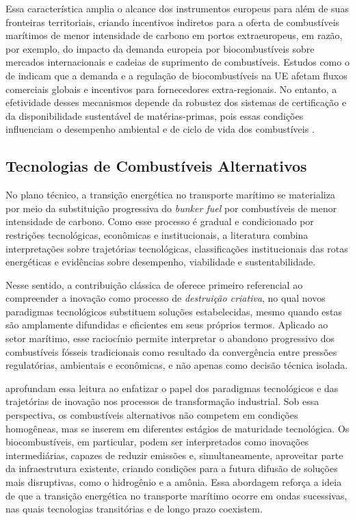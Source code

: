 Essa característica amplia o alcance dos instrumentos europeus para além de suas fronteiras territoriais, criando incentivos indiretos para a oferta de combustíveis marítimos de menor intensidade de carbono em portos extraeuropeus, em razão, por exemplo, do impacto da demanda europeia por biocombustíveis sobre mercados internacionais e cadeias de suprimento de combustíveis. Estudos como o de \citet{emsa_potential_2020} indicam que a demanda e a regulação de biocombustíveis na UE afetam fluxos comerciais globais e incentivos para fornecedores extra-regionais. No entanto, a efetividade desses mecanismos depende da robustez dos sistemas de certificação e da disponibilidade sustentável de matérias-primas, pois essas condições influenciam o desempenho ambiental e de ciclo de vida dos combustíveis \citep{cherubini_life_2011}.

\subsection{Tecnologias de Combustíveis Alternativos}
No plano técnico, a transição energética no transporte marítimo se materializa por meio da substituição progressiva do \emph{bunker fuel} por combustíveis de menor intensidade de carbono. Como esse processo é gradual e condicionado por restrições tecnológicas, econômicas e institucionais, a literatura combina interpretações sobre trajetórias tecnológicas, classificações institucionais das rotas energéticas e evidências sobre desempenho, viabilidade e sustentabilidade.

Nesse sentido, a contribuição clássica de \citet{schumpeter_business_2006} oferece primeiro referencial ao compreender a inovação como processo de \emph{destruição criativa}, no qual novos paradigmas tecnológicos substituem soluções estabelecidas, mesmo quando estas são amplamente difundidas e eficientes em seus próprios termos. Aplicado ao setor marítimo, esse raciocínio permite interpretar o abandono progressivo dos combustíveis fósseis tradicionais como resultado da convergência entre pressões regulatórias, ambientais e econômicas, e não apenas como decisão técnica isolada.

\citet{freeman_economics_1997} aprofundam essa leitura ao enfatizar o papel dos paradigmas tecnológicos e das trajetórias de inovação nos processos de transformação industrial. Sob essa perspectiva, os combustíveis alternativos não competem em condições homogêneas, mas se inserem em diferentes estágios de maturidade tecnológica. Os biocombustíveis, em particular, podem ser interpretados como inovações intermediárias, capazes de reduzir emissões e, simultaneamente, aproveitar parte da infraestrutura existente, criando condições para a futura difusão de soluções mais disruptivas, como o hidrogênio e a amônia. Essa abordagem reforça a ideia de que a transição energética no transporte marítimo ocorre em ondas sucessivas, nas quais tecnologias transitórias e de longo prazo coexistem.

